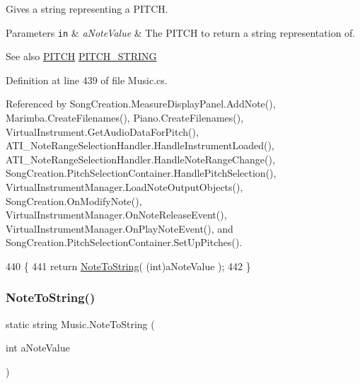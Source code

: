 Gives a string representing a P\+I\+T\+CH. 


\begin{DoxyParams}[1]{Parameters}
\mbox{\tt in}  & {\em a\+Note\+Value} & The P\+I\+T\+CH to return a string representation of.\\
\hline
\end{DoxyParams}
\begin{DoxySeeAlso}{See also}
\hyperlink{group___music_enums_ga508f69b199ea518f935486c990edac1d}{P\+I\+T\+CH} \hyperlink{group___music_constants_ga0f6eb5ac330d374c6b5021a0ba11c2bc}{P\+I\+T\+C\+H\+\_\+\+S\+T\+R\+I\+NG} 
\end{DoxySeeAlso}


Definition at line 439 of file Music.\+cs.



Referenced by Song\+Creation.\+Measure\+Display\+Panel.\+Add\+Note(), Marimba.\+Create\+Filenames(), Piano.\+Create\+Filenames(), Virtual\+Instrument.\+Get\+Audio\+Data\+For\+Pitch(), A\+T\+I\+\_\+\+Note\+Range\+Selection\+Handler.\+Handle\+Instrument\+Loaded(), A\+T\+I\+\_\+\+Note\+Range\+Selection\+Handler.\+Handle\+Note\+Range\+Change(), Song\+Creation.\+Pitch\+Selection\+Container.\+Handle\+Pitch\+Selection(), Virtual\+Instrument\+Manager.\+Load\+Note\+Output\+Objects(), Song\+Creation.\+On\+Modify\+Note(), Virtual\+Instrument\+Manager.\+On\+Note\+Release\+Event(), Virtual\+Instrument\+Manager.\+On\+Play\+Note\+Event(), and Song\+Creation.\+Pitch\+Selection\+Container.\+Set\+Up\+Pitches().


\begin{DoxyCode}
440     \{
441         \textcolor{keywordflow}{return} \hyperlink{group___music_static_func_ga85a22c905d56d4c5f4e62159bfecee8c}{NoteToString}( (\textcolor{keywordtype}{int})aNoteValue );
442     \}
\end{DoxyCode}
\mbox{\label{group___music_static_func_ga03f793951dcfe199532c9596cb539022}} 
\subsubsection{\texorpdfstring{Note\+To\+String()}{NoteToString()}\hspace{0.1cm}{\footnotesize\ttfamily [2/2]}}
{\footnotesize\ttfamily static string Music.\+Note\+To\+String (\begin{DoxyParamCaption}\item[{int}]{a\+Note\+Value }\end{DoxyParamCaption})\hspace{0.3cm}{\ttfamily [static]}}



